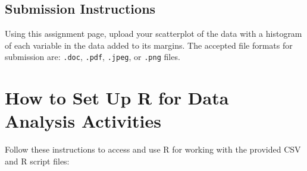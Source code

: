 \documentclass[oneside,openany]{book}
\begin{document}
\section{Submission Instructions}\label{submission-instructions}

Using this assignment page, upload your scatterplot of the data with a histogram of each variable in the data added to its margins. The accepted file formats for  submission are: \texttt{.doc}, \texttt{.pdf}, \texttt{.jpeg}, or \texttt{.png} files.

\chapter{How to Set Up R for Data Analysis Activities}\label{how-to-set-up-r-for-data-analysis-activities}

Follow these instructions to access and use R for working with the provided CSV and R script files:
\end{document}
